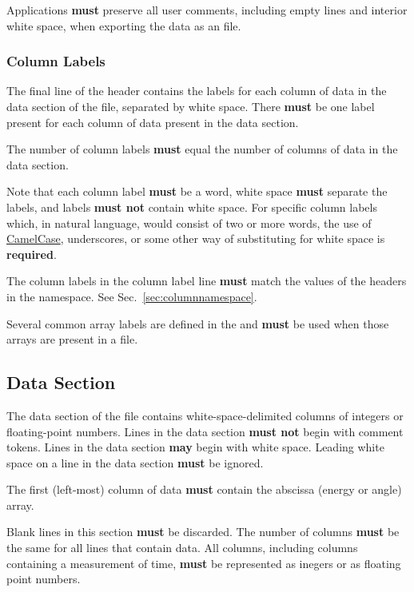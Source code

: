 \documentclass{article}
\begin{document}
Applications \textbf{must} preserve all user comments, including empty
lines and interior white space, when exporting the {\xdi} data as an
{\xdi} file.



\subsubsection{Column Labels}
\label{sec:def_hdr_labels}

The final line of the {\xdi} header contains the labels for each
column of data in the data section of the file, separated by
white space.  There \textbf{must} be one label present for each column
of data present in the data section.

The number of column labels \textbf{must} equal the number of columns
of data in the data section.

Note that each column label \textbf{must} be a word, white space
\textbf{must} separate the labels, and labels \textbf{must not}
contain white space. For specific column labels which, in natural
language, would consist of two or more words, the use of
\href{http://en.wikipedia.org/wiki/Camel_case}{CamelCase},
underscores, or some other way of substituting for white space is
\textbf{required}.

The column labels in the column label line \textbf{must} match the
values of the headers in the  namespace.  See
Sec.~\ref{sec:columnnamespace}.

Several common array labels are defined in the {\DMD} and
\textbf{must} be used when those arrays are present in a file.


\subsection{Data Section}
\label{sec:def_data}

The data section of the file contains white-space-delimited columns of
integers or floating-point numbers.  Lines in the data section
\textbf{must not} begin with comment tokens.  Lines in the data
section \textbf{may} begin with white space.  Leading white space on a
line in the data section \textbf{must} be ignored.

The first (left-most) column of data \textbf{must} contain the
abscissa (energy or angle) array.

Blank lines in this section \textbf{must} be discarded.  The number of
columns \textbf{must} be the same for all lines that contain data.
All columns, including columns containing a measurement of time,
\textbf{must} be represented as inegers or as floating point numbers.
\end{document}
